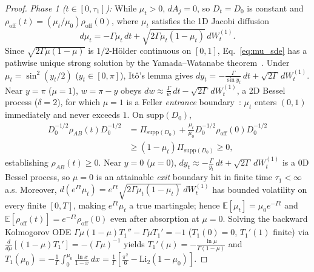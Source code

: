 \documentclass[aps,pra,10pt,twocolumn,superscriptaddress,amsmath,amssymb,floatfix]{revtex4-2}
\newcommand{\E}{\mathbb{E}}
\newcommand{\Li}{\mathrm{Li}}
\begin{document}
\begin{proof}
\emph{Phase 1 ($t \in [0, \tau_1]$):} While $\mu_t > 0$, $dA_j = 0$, so $D_t = D_0$ is constant and $\rho_{\mathrm{off}}(t) = (\mu_t/\mu_0)\rho_{\mathrm{off}}(0)$, where $\mu_t$ satisfies the 1D Jacobi diffusion
\begin{equation}
\label{eq:mu_sde}
d\mu_t = -\Gamma\mu_t\,dt + \sqrt{2\Gamma\mu_t(1-\mu_t)}\,dW_t^{(1)}.
\end{equation}
Since $\sqrt{2\Gamma\mu(1-\mu)}$ is $1/2$-H\"older continuous on $[0,1]$, Eq.~\eqref{eq:mu_sde} has a pathwise unique strong solution by the Yamada--Watanabe theorem~\cite{YamadaWatanabe1971}. Under $\mu_t = \sin^2(y_t/2)$ ($y_t \in [0,\pi]$), It\^o's lemma gives $dy_t = -\frac{\Gamma}{\sin y_t}\,dt + \sqrt{2\Gamma}\,dW_t^{(1)}$. Near $y=\pi$ ($\mu=1$), $w = \pi - y$ obeys $dw \approx \frac{\Gamma}{w}\,dt - \sqrt{2\Gamma}\,dW_t^{(1)}$, a 2D Bessel process ($\delta = 2$), for which $\mu=1$ is a Feller \emph{entrance} boundary~\cite{RevuzYor1999}: $\mu_t$ enters $(0,1)$ immediately and never exceeds $1$. On $\mathrm{supp}(D_0)$,
\begin{align*}
D_0^{-1/2}\rho_{AB}(t)D_0^{-1/2}
&= \Pi_{\mathrm{supp}(D_0)} + \frac{\mu_t}{\mu_0}D_0^{-1/2}\rho_{\mathrm{off}}(0)D_0^{-1/2} \\
&\ge (1-\mu_t)\Pi_{\mathrm{supp}(D_0)} \ge 0,
\end{align*}
establishing $\rho_{AB}(t) \ge 0$. Near $y=0$ ($\mu=0$), $dy_t \approx -\frac{\Gamma}{y_t}\,dt + \sqrt{2\Gamma}\,dW_t^{(1)}$ is a 0D Bessel process, so $\mu=0$ is an attainable \emph{exit} boundary hit in finite time $\tau_1 < \infty$ a.s. Moreover, $d(e^{\Gamma t}\mu_t) = e^{\Gamma t}\sqrt{2\Gamma\mu_t(1-\mu_t)}\,dW_t^{(1)}$ has bounded volatility on every finite $[0, T]$, making $e^{\Gamma t}\mu_t$ a true martingale; hence $\E[\mu_t] = \mu_0 e^{-\Gamma t}$ and $\E[\rho_{\mathrm{off}}(t)] = e^{-\Gamma t}\rho_{\mathrm{off}}(0)$ even after absorption at $\mu=0$. Solving the backward Kolmogorov ODE $\Gamma\mu(1-\mu)T_1'' - \Gamma\mu T_1' = -1$ ($T_1(0)=0$, $T_1'(1)$ finite) via $\frac{d}{d\mu}[(1-\mu)T_1'] = -(\Gamma\mu)^{-1}$ yields $T_1'(\mu) = -\frac{\ln\mu}{\Gamma(1-\mu)}$ and $T_1(\mu_0) = -\frac{1}{\Gamma}\int_0^{\mu_0}\frac{\ln x}{1-x}\,dx = \frac{1}{\Gamma}[\frac{\pi^2}{6} - \Li_2(1-\mu_0)]$.


\end{proof}
\end{document}
